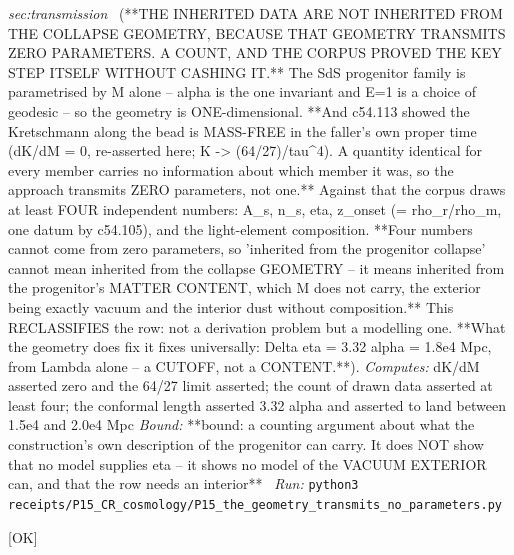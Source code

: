 \begin{description}
\textit{sec:transmission} \ (**THE INHERITED DATA ARE NOT INHERITED FROM THE COLLAPSE GEOMETRY, BECAUSE THAT GEOMETRY TRANSMITS ZERO PARAMETERS. A COUNT, AND THE CORPUS PROVED THE KEY STEP ITSELF WITHOUT CASHING IT.** The SdS progenitor family is parametrised by M alone -- alpha is the one invariant and E=1 is a choice of geodesic -- so the geometry is ONE-dimensional. **And c54.113 showed the Kretschmann along the bead is MASS-FREE in the faller's own proper time (dK/dM = 0, re-asserted here; K -> (64/27)/tau\textasciicircum{}4). A quantity identical for every member carries no information about which member it was, so the approach transmits ZERO parameters, not one.** Against that the corpus draws at least FOUR independent numbers: A\_s, n\_s, eta, z\_onset (= rho\_r/rho\_m, one datum by c54.105), and the light-element composition. **Four numbers cannot come from zero parameters, so 'inherited from the progenitor collapse' cannot mean inherited from the collapse GEOMETRY -- it means inherited from the progenitor's MATTER CONTENT, which M does not carry, the exterior being exactly vacuum and the interior dust without composition.** This RECLASSIFIES the row: not a derivation problem but a modelling one. **What the geometry does fix it fixes universally: \textbar{}Delta eta\textbar{} = 3.32 alpha = 1.8e4 Mpc, from Lambda alone -- a CUTOFF, not a CONTENT.**). 
\emph{Computes:} dK/dM asserted zero and the 64/27 limit asserted; the count of drawn data asserted at least four; the conformal length asserted 3.32 alpha and asserted to land between 1.5e4 and 2.0e4 Mpc
 \emph{Bound:} **bound: a counting argument about what the construction's own description of the progenitor can carry. It does NOT show that no model supplies eta -- it shows no model of the VACUUM EXTERIOR can, and that the row needs an interior**
\ \emph{Run:} \texttt{python3 receipts/P15\_CR\_cosmology/P15\_the\_geometry\_transmits\_no\_parameters.py}
\item[\label{rcpt:P15_hbar_survives_in_As_and_cancels_in_ns}\texttt{P15\_hbar\_survives\_in\_As\_and\_cancels\_in\_ns}]\hfill\textsf{[OK]}\\

\end{description}

